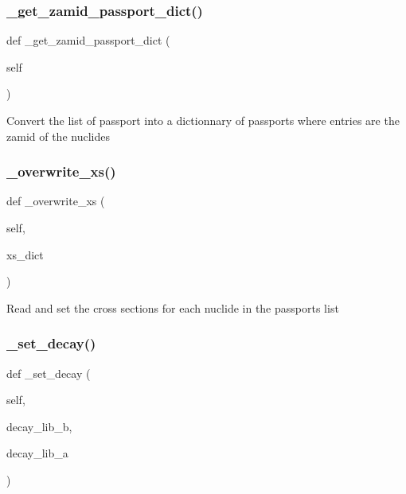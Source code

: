 \subsubsection{\texorpdfstring{\+\_\+get\+\_\+zamid\+\_\+passport\+\_\+dict()}{\_get\_zamid\_passport\_dict()}}
{\footnotesize\ttfamily def \+\_\+get\+\_\+zamid\+\_\+passport\+\_\+dict (\begin{DoxyParamCaption}\item[{}]{self }\end{DoxyParamCaption})\hspace{0.3cm}{\ttfamily [private]}}

\begin{DoxyVerb}Convert the list of passport into a dictionnary of passports where entries are the zamid of the nuclides\end{DoxyVerb}
 \mbox{\label{classopenbu_1_1passlist_1_1_passlist_a2eec6817afb9bc29c4c86d97cdb56947}} 
\subsubsection{\texorpdfstring{\+\_\+overwrite\+\_\+xs()}{\_overwrite\_xs()}}
{\footnotesize\ttfamily def \+\_\+overwrite\+\_\+xs (\begin{DoxyParamCaption}\item[{}]{self,  }\item[{}]{xs\+\_\+dict }\end{DoxyParamCaption})\hspace{0.3cm}{\ttfamily [private]}}

\begin{DoxyVerb}Read and set the cross sections for each nuclide in the passports list\end{DoxyVerb}
 \mbox{\label{classopenbu_1_1passlist_1_1_passlist_a4bf49923534fe53d939d4face28cf0f0}} 
\subsubsection{\texorpdfstring{\+\_\+set\+\_\+decay()}{\_set\_decay()}}
{\footnotesize\ttfamily def \+\_\+set\+\_\+decay (\begin{DoxyParamCaption}\item[{}]{self,  }\item[{}]{decay\+\_\+lib\+\_\+b,  }\item[{}]{decay\+\_\+lib\+\_\+a }\end{DoxyParamCaption})\hspace{0.3cm}{\ttfamily [private]}}

